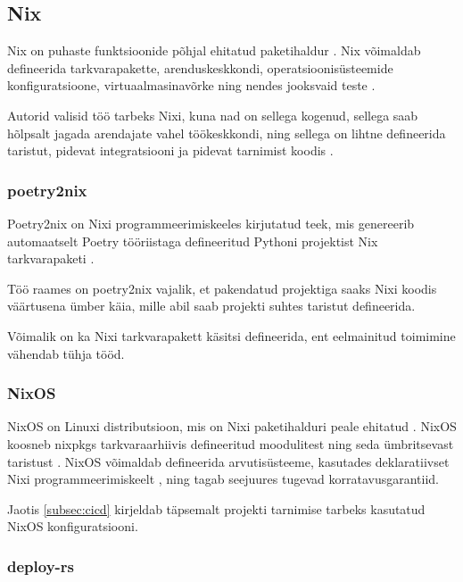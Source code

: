 \subsection{Nix}\label{subsec:nix}

Nix on puhaste funktsioonide põhjal ehitatud paketihaldur \cite{nixos-how-nix-works}. Nix võimaldab defineerida tarkvarapakette, arenduskeskkondi, operatsioonisüsteemide konfiguratsioone, virtuaalmasinavõrke ning nendes jooksvaid teste \cite{nixos-explore, nixos-manual-vmtests}.

Autorid valisid töö tarbeks Nixi, kuna nad on sellega kogenud, sellega saab hõlpsalt jagada arendajate vahel töökeskkondi, ning sellega on lihtne defineerida taristut, pidevat integratsiooni ja pidevat tarnimist koodis \cite{nixos-explore}.

\subsubsection{poetry2nix}\label{subsubsec:poetry2nix}

Poetry2nix on Nixi programmeerimiskeeles kirjutatud teek, mis genereerib automaatselt Poetry tööriistaga defineeritud Pythoni projektist Nix tarkvarapaketi \cite{poetry2nix-repo}.

Töö raames on poetry2nix vajalik, et pakendatud projektiga saaks Nixi koodis väärtusena ümber käia, mille abil saab projekti suhtes taristut defineerida.

Võimalik on ka Nixi tarkvarapakett käsitsi defineerida, ent eelmainitud toimimine vähendab tühja tööd.

\subsubsection{NixOS}

NixOS on Linuxi distributsioon, mis on Nixi paketihalduri peale ehitatud \cite{nixos-manual-preface}. NixOS koosneb nixpkgs tarkvaraarhiivis defineeritud moodulitest ning seda ümbritsevast taristust \cite{nixos-manual-preface}. NixOS võimaldab defineerida arvutisüsteeme, kasutades deklaratiivset Nixi programmeerimiskeelt \cite{nixos-manual-configuration}, ning tagab seejuures tugevad korratavusgarantiid.

Jaotis \ref{subsec:cicd} kirjeldab täpsemalt projekti tarnimise tarbeks kasutatud NixOS konfiguratsiooni.

\subsubsection{deploy-rs}\label{subsubsec:deploy-rs}


